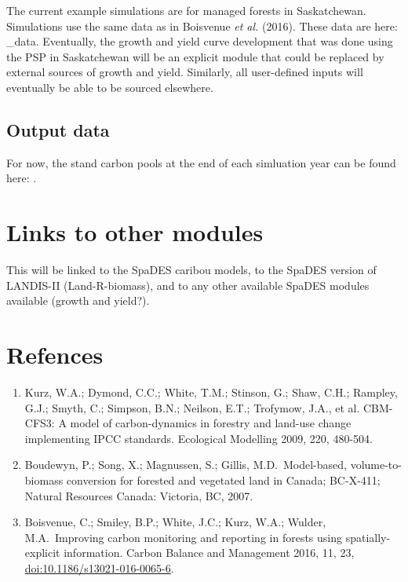 \documentclass[]{article}
\providecommand{\tightlist}{%
  \setlength{\itemsep}{0pt}\setlength{\parskip}{0pt}}
\begin{document}
The current example simulations are for managed forests in Saskatchewan.
Simulations use the same data as in Boisvenue \emph{et al.} (2016).
These data are here: \spadesCBM\data\forIan\SK\_data. Eventually, the
growth and yield curve development that was done using the PSP in
Saskatchewan will be an explicit module that could be replaced by
external sources of growth and yield. Similarly, all user-defined inputs
will eventually be able to be sourced elsewhere.

\subsection{Output data}\label{output-data}

For now, the stand carbon pools at the end of each simluation year can
be found here: \spadesCBM\outputs.

\section{Links to other modules}\label{links-to-other-modules}

This will be linked to the SpaDES caribou models, to the SpaDES version
of LANDIS-II (Land-R-biomass), and to any other available SpaDES modules
available (growth and yield?).

\section{Refences}\label{refences}

\begin{enumerate}
\def\labelenumi{\arabic{enumi}.}
\tightlist
\item
  Kurz, W.A.; Dymond, C.C.; White, T.M.; Stinson, G.; Shaw, C.H.;
  Rampley, G.J.; Smyth, C.; Simpson, B.N.; Neilson, E.T.; Trofymow,
  J.A., et al. CBM-CFS3: A model of carbon-dynamics in forestry and
  land-use change implementing IPCC standards. Ecological Modelling
  2009, 220, 480-504.
\item
  Boudewyn, P.; Song, X.; Magnussen, S.; Gillis, M.D.~Model-based,
  volume-to-biomass conversion for forested and vegetated land in
  Canada; BC-X-411; Natural Resources Canada: Victoria, BC, 2007.
\item
  Boisvenue, C.; Smiley, B.P.; White, J.C.; Kurz, W.A.; Wulder,
  M.A.~Improving carbon monitoring and reporting in forests using
  spatially-explicit information. Carbon Balance and Management 2016,
  11, 23, \url{doi:10.1186/s13021-016-0065-6}.
\end{enumerate}
\end{document}
